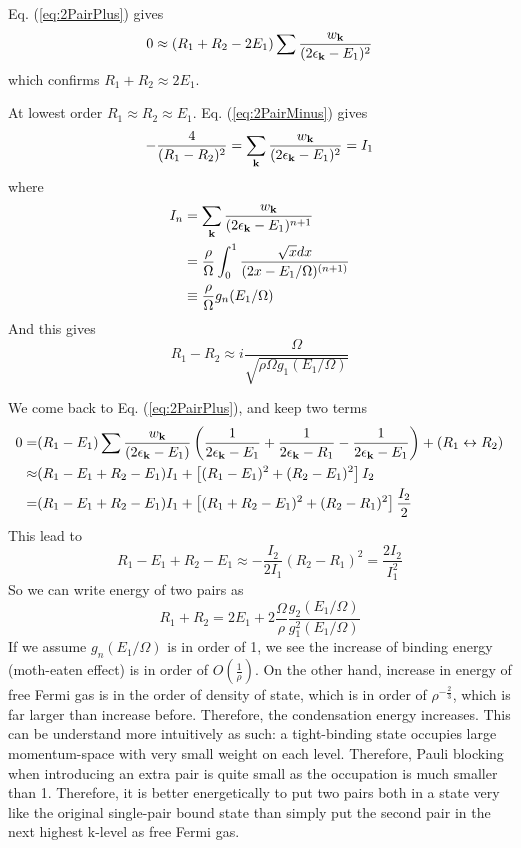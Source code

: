 \documentclass{article}
\begin{document}
Eq. (\ref{eq:2PairPlus}) gives 
\begin{equation*}
0\approx(R_1+R_2-2E_1)\sum\frac{w_{\mathbf{k}}}{(2\epsilon_{\mathbf{k}}-E_1)^2}
\label{eq:}
\end{equation*}
which confirms  $R_1+R_2\approx2E_1$.

At lowest order $R_1\approx{}R_2\approx{}E_1$.  Eq. (\ref{eq:2PairMinus}) gives 
\begin{equation}
-\frac{4}{(R_1-R_2)^2}=\sum_{\mathbf{k}}\frac{w_{\mathbf{k}}}{(2\epsilon_{\mathbf{k}}-E_1)^2}=I_1
\label{eq:}
\end{equation}
where 
\begin{equation}
\begin{split}
I_n&=\sum_{\mathbf{k}}\frac{w_{\mathbf{k}}}{(2\epsilon_{\mathbf{k}}-E_1)^{n+1}}\\
	&=\frac{\rho}{\Omega}\int^1_0\frac{\sqrt{x}dx}{(2x-E_1/\Omega)^{(n+1)}}\\
	&\equiv\frac{\rho}{\Omega}g_n(E_1/\Omega)
\end{split}
\label{eq:}
\end{equation}
And this gives 
\begin{equation}
R_1-R_2\approx{}i\frac{\Omega}{\sqrt{\rho\Omega{}g_1(E_1/\Omega)}}
\label{eq:}
\end{equation}

We come back to Eq. (\ref{eq:2PairPlus}), and keep two terms
\begin{equation}
\begin{split}
0=&(R_1-E_1)\sum{\frac{w_{\ensuremath{\mathbf{k}}}}{(2\epsilon_{\ensuremath{\mathbf{k}}}-E_1)}}\left(\frac{1}{2\epsilon_{\mathbf{k}}-E_1}+\frac{1}{2\epsilon_{\mathbf{k}}-R_1}-\frac{1}{2\epsilon_{\mathbf{k}}-E_1}\right)+(R_1\leftrightarrow{}R_2)\\
\approx&(R_1-E_1+R_2-E_1)I_1+\left[(R_1-E_1)^2+(R_2-E_1)^2\right]I_2\\
=&(R_1-E_1+R_2-E_1)I_1+\left[(R_1+R_2-E_1)^2+(R_2-R_1)^2\right]\frac{I_2}{2}
\end{split}
\label{eq:}
\end{equation}
This lead to 
\begin{equation}
R_1-E_1+R_2-E_1\approx-\frac{I_2}{2I_1}(R_2-R_1)^2=\frac{2I_2}{I_1^2}
\label{eq:}
\end{equation}
So we can write energy of two pairs as
\begin{equation}
R_1+R_2=2E_1+2\frac{\Omega}{\rho}\frac{g_2(E_1/\Omega)}{g_1^2(E_1/\Omega)}
\label{eq:}
\end{equation}
If we assume $g_n(E_1/\Omega)$ is in order of 1, we see the increase of binding energy (moth-eaten effect) is in order of $O(\frac{1}{\rho})$.  On the other hand, increase in energy of free Fermi gas is in the order of density of state, which is in order of $\rho^{-\frac{2}{3}}$, which is far larger than increase before.  Therefore, the condensation energy increases. This can be understand more intuitively as such: a tight-binding state occupies large momentum-space with very small weight on each level. Therefore, Pauli blocking when introducing an extra pair is quite small as the occupation is much smaller than 1. Therefore, it is better energetically to put two pairs both in a state very like the original single-pair bound state than simply put the second pair in the next highest k-level as free Fermi gas.   
\end{document}
